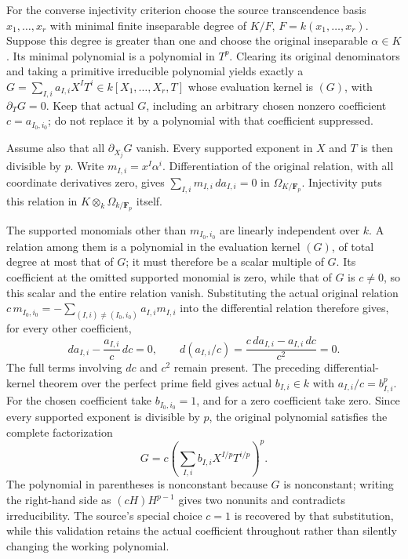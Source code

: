 For the converse injectivity criterion choose the source transcendence basis \(x_1,\ldots,x_r\) with minimal finite inseparable degree of \(K/F\), \(F=k(x_1,\ldots,x_r)\). Suppose this degree is greater than one and choose the original inseparable \(\alpha\in K\). Its minimal polynomial is a polynomial in \(T^p\). Clearing its original denominators and taking a primitive irreducible polynomial yields exactly a \(G=\sum_{I,i} a_{I,i}X^IT^i\in k[X_1,\ldots,X_r,T]\) whose evaluation kernel is \((G)\), with \(\partial_TG=0\). Keep that actual \(G\), including an arbitrary chosen nonzero coefficient \(c=a_{I_0,i_0}\); do not replace it by a polynomial with that coefficient suppressed.

Assume also that all \(\partial_{X_j}G\) vanish. Every supported exponent in \(X\) and \(T\) is then divisible by \(p\). Write \(m_{I,i}=x^I\alpha^i\). Differentiation of the original relation, with all coordinate derivatives zero, gives \(\sum_{I,i}m_{I,i}\,da_{I,i}=0\) in \(\Omega_{K/\mathbf F_p}\). Injectivity puts this relation in \(K\otimes_k\Omega_{k/\mathbf F_p}\) itself.

The supported monomials other than \(m_{I_0,i_0}\) are linearly independent over \(k\). A relation among them is a polynomial in the evaluation kernel \((G)\), of total degree at most that of \(G\); it must therefore be a scalar multiple of \(G\). Its coefficient at the omitted supported monomial is zero, while that of \(G\) is \(c\ne0\), so this scalar and the entire relation vanish. Substituting the actual original relation \(c\,m_{I_0,i_0}=-\sum_{(I,i)\ne(I_0,i_0)}a_{I,i}m_{I,i}\) into the differential relation therefore gives, for every other coefficient, \[
 da_{I,i}-\frac{a_{I,i}}c\,dc=0,
 \qquad
 d(a_{I,i}/c)=\frac{c\,da_{I,i}-a_{I,i}\,dc}{c^2}=0.
\] The full terms involving \(dc\) and \(c^2\) remain present. The preceding differential-kernel theorem over the perfect prime field gives actual \(b_{I,i}\in k\) with \(a_{I,i}/c=b_{I,i}^p\). For the chosen coefficient take \(b_{I_0,i_0}=1\), and for a zero coefficient take zero. Since every supported exponent is divisible by \(p\), the original polynomial satisfies the complete factorization \[
 G=c\left(\sum_{I,i} b_{I,i}X^{I/p}T^{i/p}\right)^p.
\] The polynomial in parentheses is nonconstant because \(G\) is nonconstant; writing the right-hand side as \((cH)H^{p-1}\) gives two nonunits and contradicts irreducibility. The source's special choice \(c=1\) is recovered by that substitution, while this validation retains the actual coefficient throughout rather than silently changing the working polynomial.

